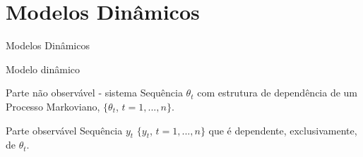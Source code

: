 \documentclass{beamer}
\begin{document}
\section{Modelos Dinâmicos}


\begin{frame}{ }
    \begin{block}{ }
      \Huge  Modelos Dinâmicos
    \end{block}
\end{frame}


\begin{frame}{Modelo dinâmico}
\noindent

 
  \begin{block}{Parte não observável - sistema}
  {\large Sequência $\theta_t$ com estrutura de dependência de um Processo Markoviano, $\{\theta_t$, $t=1,...,n\}$.}
\end{block}

\pause
  \begin{block}{Parte observável}
  {\large Sequência $y_t$ $\{y_t$, $t=1,...,n\}$ que é dependente, exclusivamente, de $\theta_t$.}
\end{block}
  

\end{frame}
\end{document}
